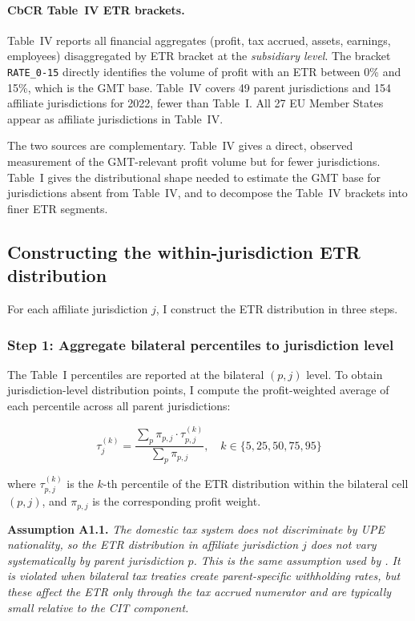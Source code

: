 \documentclass[11pt,a4paper]{article}
\newcommand{\code}[1]{\texttt{#1}}
\newcommand{\assumption}[2]{\noindent\textbf{Assumption #1.} \textit{#2}\medskip}
\begin{document}
\paragraph{CbCR Table~IV ETR brackets.} Table~IV reports all financial aggregates (profit, tax accrued, assets, earnings, employees) disaggregated by ETR bracket at the \emph{subsidiary level}. The bracket \code{RATE\_0-15} directly identifies the volume of profit with an ETR between 0\% and 15\%, which is the GMT base. Table~IV covers 49 parent jurisdictions and 154 affiliate jurisdictions for 2022, fewer than Table~I. All 27 EU Member States appear as affiliate jurisdictions in Table~IV.

The two sources are complementary. Table~IV gives a direct, observed measurement of the GMT-relevant profit volume but for fewer jurisdictions. Table~I gives the distributional shape needed to estimate the GMT base for jurisdictions absent from Table~IV, and to decompose the Table~IV brackets into finer ETR segments.

\subsection{Constructing the within-jurisdiction ETR distribution}\label{sec:etr_dist}

For each affiliate jurisdiction $j$, I construct the ETR distribution in three steps.

\subsubsection{Step 1: Aggregate bilateral percentiles to jurisdiction level}

The Table~I percentiles are reported at the bilateral $(p, j)$ level. To obtain jurisdiction-level distribution points, I compute the profit-weighted average of each percentile across all parent jurisdictions:

\begin{equation}\label{eq:jurisdiction_percentile}
\tau_j^{(k)} = \frac{\sum_p \pi_{p,j} \cdot \tau_{p,j}^{(k)}}{\sum_p \pi_{p,j}}, \quad k \in \{5, 25, 50, 75, 95\}
\end{equation}

where $\tau_{p,j}^{(k)}$ is the $k$-th percentile of the ETR distribution within the bilateral cell $(p, j)$, and $\pi_{p,j}$ is the corresponding profit weight.

\assumption{A1.1}{The domestic tax system does not discriminate by UPE nationality, so the ETR distribution in affiliate jurisdiction $j$ does not vary systematically by parent jurisdiction $p$. This is the same assumption used by \citet{hugger2025}. It is violated when bilateral tax treaties create parent-specific withholding rates, but these affect the ETR only through the tax accrued numerator and are typically small relative to the CIT component.}
\end{document}
